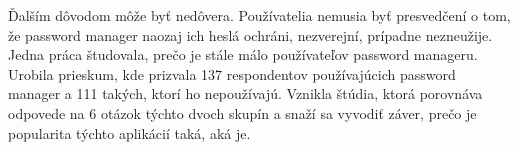 \par Ďalším dôvodom môže byť nedôvera. Používatelia nemusia byť presvedčení o tom, že password manager naozaj ich heslá ochráni, nezverejní, prípadne nezneužije. Jedna práca \cite{23} študovala, prečo je stále málo používateľov password manageru. Urobila prieskum, kde prizvala 137 respondentov používajúcich password manager a 111 takých, ktorí ho nepoužívajú. Vznikla štúdia, ktorá porovnáva odpovede na 6 otázok týchto dvoch skupín a snaží sa vyvodiť záver, prečo je popularita týchto aplikácií taká, aká je.